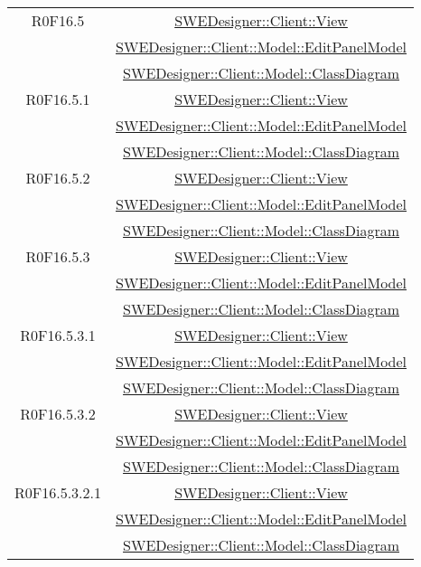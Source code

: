 \documentclass[../SpecificaTecnica.tex]{subfiles}
\begin{document}
\begin{longtable}{|c|c|}
		R0F16.5 & \hyperlink{SWEDesigner::Client::View}{SWEDesigner::Client::View} \\& \hyperlink{SWEDesigner::Client::Model::EditPanelModel}{SWEDesigner::Client::Model::EditPanelModel} \\& \hyperlink{SWEDesigner::Client::Model::ClassDiagram}{SWEDesigner::Client::Model::ClassDiagram}\\\hline
		R0F16.5.1 & \hyperlink{SWEDesigner::Client::View}{SWEDesigner::Client::View} \\& \hyperlink{SWEDesigner::Client::Model::EditPanelModel}{SWEDesigner::Client::Model::EditPanelModel} \\& \hyperlink{SWEDesigner::Client::Model::ClassDiagram}{SWEDesigner::Client::Model::ClassDiagram}\\\hline
		R0F16.5.2 & \hyperlink{SWEDesigner::Client::View}{SWEDesigner::Client::View} \\& \hyperlink{SWEDesigner::Client::Model::EditPanelModel}{SWEDesigner::Client::Model::EditPanelModel} \\& \hyperlink{SWEDesigner::Client::Model::ClassDiagram}{SWEDesigner::Client::Model::ClassDiagram}\\\hline
		R0F16.5.3 & \hyperlink{SWEDesigner::Client::View}{SWEDesigner::Client::View} \\& \hyperlink{SWEDesigner::Client::Model::EditPanelModel}{SWEDesigner::Client::Model::EditPanelModel} \\& \hyperlink{SWEDesigner::Client::Model::ClassDiagram}{SWEDesigner::Client::Model::ClassDiagram}\\\hline
		R0F16.5.3.1 & \hyperlink{SWEDesigner::Client::View}{SWEDesigner::Client::View} \\& \hyperlink{SWEDesigner::Client::Model::EditPanelModel}{SWEDesigner::Client::Model::EditPanelModel} \\& \hyperlink{SWEDesigner::Client::Model::ClassDiagram}{SWEDesigner::Client::Model::ClassDiagram}\\\hline
		R0F16.5.3.2 & \hyperlink{SWEDesigner::Client::View}{SWEDesigner::Client::View} \\& \hyperlink{SWEDesigner::Client::Model::EditPanelModel}{SWEDesigner::Client::Model::EditPanelModel} \\& \hyperlink{SWEDesigner::Client::Model::ClassDiagram}{SWEDesigner::Client::Model::ClassDiagram}\\\hline
		R0F16.5.3.2.1 & \hyperlink{SWEDesigner::Client::View}{SWEDesigner::Client::View} \\& \hyperlink{SWEDesigner::Client::Model::EditPanelModel}{SWEDesigner::Client::Model::EditPanelModel} \\& \hyperlink{SWEDesigner::Client::Model::ClassDiagram}{SWEDesigner::Client::Model::ClassDiagram}\\\hline

\end{longtable}
\end{document}
